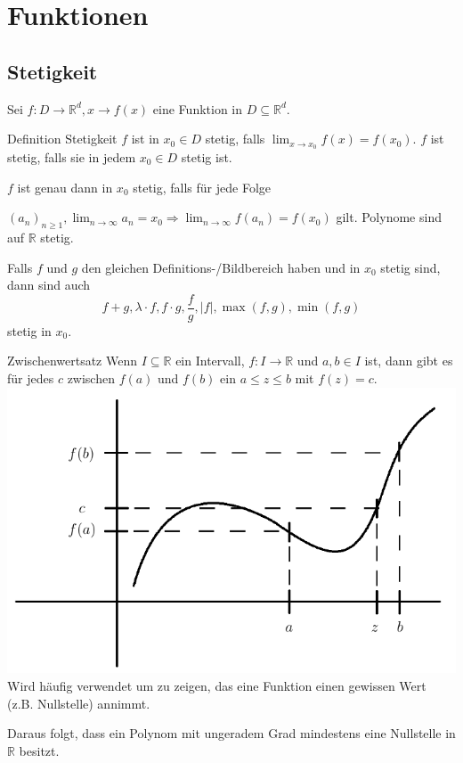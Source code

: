 \documentclass[a4paper,10pt]{article}
\def\limn{\lim_{n\to \infty}}
\def\R{\mathbb{R}}
\begin{document}
\section{Funktionen}
\subsection{Stetigkeit}
Sei $f : D \to \R^d, x \to f(x)$ eine Funktion in $D \subseteq \R^d$.
\begin{mainbox}{Definition Stetigkeit}
 $f$ ist in $x_0 \in D$ stetig, falls $\lim_{x\to x_0} f(x) = f(x_0)$.
 $f$ ist stetig, falls sie in jedem $x_0 \in D$ stetig ist.
\end{mainbox}

$f$ ist genau dann in $x_0$ stetig, falls für jede Folge \par $(a_n)_{n\geq 1}, \limn a_n = x_0 \Rightarrow \limn f(a_n) = f(x_0)$ gilt. Polynome sind auf $\R$ stetig.
\begin{subbox}{}
 Falls $f$ und $g$ den gleichen Definitions-/Bildbereich haben und in $x_0$ stetig sind, dann sind auch $$f + g, \lambda \cdot f, f \cdot g, \frac{f}{g}, |f|, \max(f,g), \min(f,g)$$ stetig in $x_0$.
\end{subbox}


\begin{mainbox}{Zwischenwertsatz}
 Wenn $I \subseteq \R$ ein Intervall, $f: I \to \R$ und $a, b \in I$ ist, dann gibt es für jedes $c$ zwischen $f(a)$ und $f(b)$ ein $a \le z \le b$ mit $f(z) = c$.
 \includegraphics[width=\linewidth]{zwischenwertsatz.png}
 Wird häufig verwendet um zu zeigen, das eine Funktion einen gewissen Wert (z.B. Nullstelle) annimmt.
\end{mainbox}
Daraus folgt, dass ein Polynom mit ungeradem Grad mindestens eine Nullstelle in $\R$ besitzt.
\end{document}
